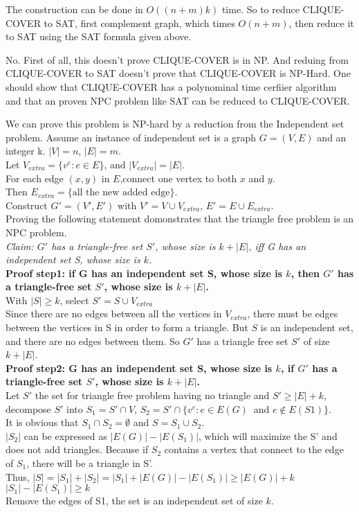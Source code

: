 \documentclass[12pt,a4paper]{article}
\newcommand{\question}[1]{\bigskip\noindent{\textbf{Q{#1} solution}}}
\begin{document}
The construction can be done in $O((n+m)k)$ time. So to reduce CLIQUE-COVER to SAT, first complement graph, which times $O(n + m)$, then reduce it to SAT using the SAT formula given above.


\question{32.B}

No. First of all, this doesn't prove CLIQUE-COVER is in NP. And reduing from CLIQUE-COVER to SAT doesn't prove that CLIQUE-COVER is NP-Hard. One should show that CLIQUE-COVER has a polynominal time cerfiier algorithm and that an proven NPC problem like SAT can be reduced to CLIQUE-COVER.

\question{33}

\noindent
We can prove this problem is NP-hard by a reduction from the Independent set problem.
Assume an instance of independent set is a graph $G=(V,E)$ and an integer k. $|V| = n$, $|E| = m$.\\
Let $V_{extra} = \{v^e:e \in E\}$, and $|V_{extra}|=|E|$. \\
For each edge $(x,y)$ in $E$,connect one vertex to both $x$ and $y$.\\
Then $E_{extra} = \{\mbox{all the new added edge}\}$.\\
Construct $G' = (V',E')$ with $V' = V \cup V_{extra}$, $E'= E \cup E_{extra} $.\\
Proving the following statement domonstrates that the triangle free problem is an NPC problem.\\
{\em Claim: $G'$ has a triangle-free set $S'$, whose size is $k+|E|$, iff G has an independent set S, whose size is  $k$.}\cite{triangle}\\
\textbf{Proof step1: if G has an independent set S, whose size is $k$, then $G'$ has a triangle-free set $S'$, whose size is $k+|E|$.}\\
With $|S| \ge k$, select $S' = S \cup V_{extra}$\\
Since there are no edges between all the vertices in $V_{extra}$, there must be edges between the vertices in S in order to form a triangle. But $S$ is an independent set, and there are no edges between them. So $G'$ has a triangle free set $S'$ of size $k+|E|$.\\


\noindent
\textbf{Proof step2: G has an independent set S, whose size is $k$, if $G'$ has a triangle-free set $S'$, whose size is $k+|E|$.}\\
Let $S'$ the set for triangle free problem having no triangle and $S'\ge |E|+k$, decompose $S'$ into $S_1 = S' \cap V$, $S_2 = S' \cap \{v^e:e \in E(G)\ $ and $e \notin E(S1)\}$.\\
It is obvious that $S_1 \cap S_2 = \emptyset$ and $S=S_1 \cup S_2$.\\
$|S_2|$ can be expressed as $|E(G)|-|E(S_1)|$, which will maximize the S' and does not add triangles. Because if $S_2$ contains a vertex that connect to the edge of $S_1$, there will be a triangle in S'.\\
Thus, $|S| = |S_1|+|S_2|=|S_1|+|E(G)|-|E(S_1)|\ge |E(G)|+k $\\
$|S_1|-|E(S_1)|\ge k$\\
Remove the edges of S1, the set is an independent set of size $k$.\\
\end{document}
